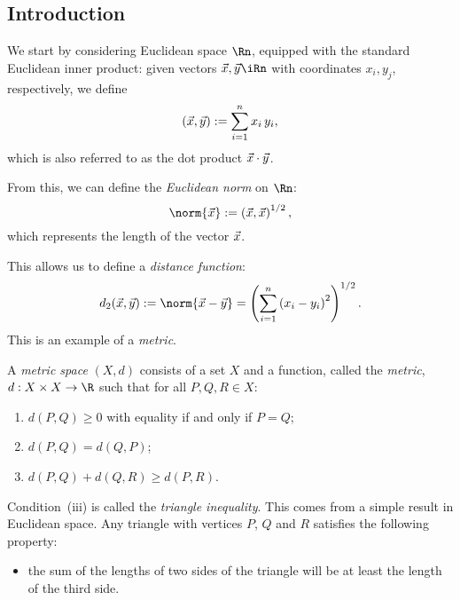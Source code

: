 \setcounter{lecture}{1}

\subsection{Introduction} %
\label{sub:introduction}

We start by considering Euclidean space $\Rn$, equipped with the standard Euclidean inner product: given vectors $\xx,\yy\iRn$ with coordinates $x_i,y_j$, respectively, we define
\begin{equation*}
	\left( \vec{x},\vec{y} \right) := \sum_{i=1}^n x_i \, y_i,
\end{equation*}
which is also referred to as the dot product $\vec{x} \cdot \vec{y}$.

From this, we can define the \emph{Euclidean norm} on $\Rn$:
\begin{equation*}
	\norm{\xx} := \left( \xx,\xx \right)^{1/2},
\end{equation*}
which represents the length of the vector $\vec{x}$.

This allows us to define a \emph{distance function}:
\begin{equation*}
	d_2(\xx,\yy)
	:= \norm{\xx-\yy}
	= \left( \sum_{i=1}^n \left( x_i-y_i \right)^2 \right)^{1/2}.
\end{equation*}
This is an example of a \emph{metric}.

\begin{definition}
	A \emph{metric space} $(X,d)$ consists of a set $X$ and a function, called the \emph{metric}, $d:X\times X\to\R$ such that for all $P,Q,R \in X$: %
	\begin{enumerate}
		\shortskip
		\item $d(P,Q)\geq 0$ with equality if and only if $P=Q$;
		\item $d(P,Q)=d(Q,P)$;
		\item $d(P,Q) + d(Q,R) \geq d(P,R)$.
	\end{enumerate}
\end{definition}

Condition~(iii) is called the \emph{triangle inequality}. This comes from a simple result in Euclidean space. Any triangle with vertices $P$, $Q$ and $R$ satisfies the following property:

\begin{itemize}
	\shortskip
	\item [] the sum of the lengths of two sides of the triangle will be at least the length of the third side.
\end{itemize}

